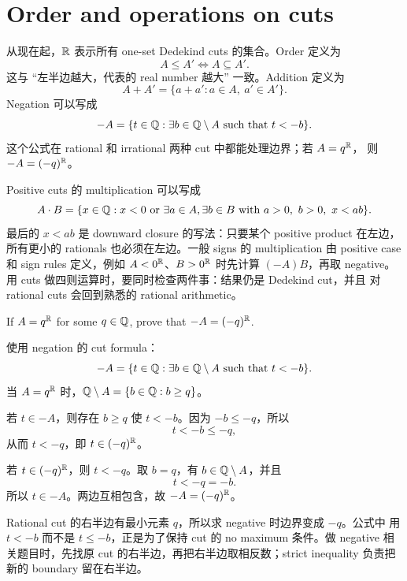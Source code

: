 \section{Order and operations on cuts}

从现在起，\(\mathbb{R}\) 表示所有 one-set Dedekind cuts 的集合。Order 定义为
\[
  A\leq A' \Longleftrightarrow A\subseteq A'.
\]
这与 ``左半边越大，代表的 real number 越大'' 一致。Addition 定义为
\[
  A+A'=\{a+a':a\in A,\ a'\in A'\}.
\]
Negation 可以写成
\[
  -A=\{t\in\mathbb{Q}:\exists b\in\mathbb{Q}\setminus A\text{ such that }t<-b\}.
\]
这个公式在 rational 和 irrational 两种 cut 中都能处理边界；若 \(A=q^{\mathbb{R}}\)，
则 \(-A=(-q)^{\mathbb{R}}\)。

Positive cuts 的 multiplication 可以写成
\[
  A\cdot B=
  \{x\in\mathbb{Q}:x<0\text{ or }\exists a\in A,\exists b\in B
    \text{ with }a>0,\ b>0,\ x<ab\}.
\]
最后的 \(x<ab\) 是 downward closure 的写法：只要某个 positive product 在左边，
所有更小的 rationals 也必须在左边。一般 signs 的 multiplication 由 positive case
和 sign rules 定义，例如 \(A<0^{\mathbb{R}}\)、\(B>0^{\mathbb{R}}\) 时先计算 \((-A)B\)，再取
negative。用 cuts 做四则运算时，要同时检查两件事：结果仍是 Dedekind cut，并且
对 rational cuts 会回到熟悉的 rational arithmetic。

\begin{exerciseblock}
If \(A=q^{\mathbb{R}}\) for some \(q\in\mathbb{Q}\), prove that \(-A=(-q)^{\mathbb{R}}\).
\end{exerciseblock}

\begin{solution}
使用 negation 的 cut formula：
\[
  -A=\{t\in\mathbb{Q}:\exists b\in\mathbb{Q}\setminus A\text{ such that }t<-b\}.
\]
当 \(A=q^{\mathbb{R}}\) 时，\(\mathbb{Q}\setminus A=\{b\in\mathbb{Q}:b\geq q\}\)。

若 \(t\in -A\)，则存在 \(b\geq q\) 使 \(t<-b\)。因为 \(-b\leq -q\)，所以
\[
  t<-b\leq -q,
\]
从而 \(t< -q\)，即 \(t\in(-q)^{\mathbb{R}}\)。

若 \(t\in(-q)^{\mathbb{R}}\)，则 \(t<-q\)。取 \(b=q\)，有 \(b\in\mathbb{Q}\setminus A\)，并且
\[
  t<-q=-b.
\]
所以 \(t\in -A\)。两边互相包含，故 \(-A=(-q)^{\mathbb{R}}\)。
\end{solution}

\begin{explanation}
Rational cut 的右半边有最小元素 \(q\)，所以求 negative 时边界变成 \(-q\)。公式中
用 \(t<-b\) 而不是 \(t\leq -b\)，正是为了保持 cut 的 no maximum 条件。做
negative 相关题目时，先找原 cut 的右半边，再把右半边取相反数；strict inequality
负责把新的 boundary 留在右半边。
\end{explanation}

